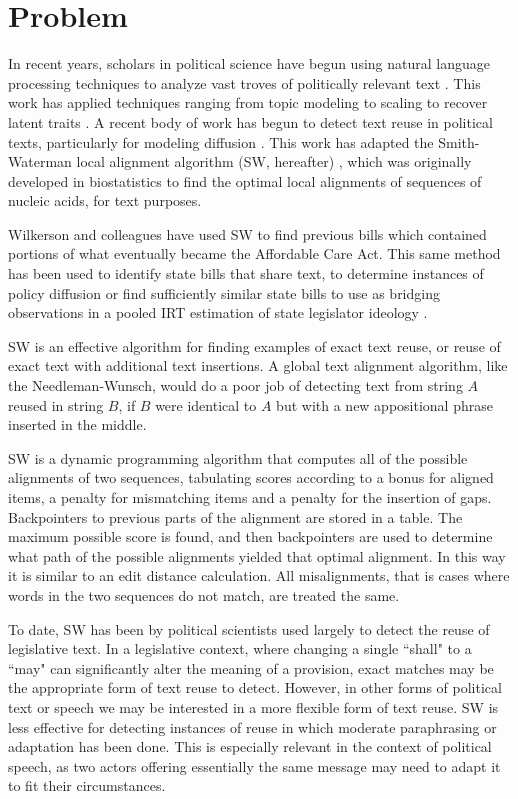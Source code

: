 \section{Problem}
In recent years, scholars in political science have begun using natural language processing techniques to analyze vast troves of politically relevant text \cite{grimmer2013text}. This work has applied techniques ranging from topic modeling \cite{roberts2014structural} to scaling to recover latent traits \cite{lowe2013validating}. A recent body of work has begun to detect text reuse in political texts, particularly for modeling diffusion \cite{smith2013infectious,smith2014detecting}. This work has adapted the Smith-Waterman local alignment algorithm (SW, hereafter) \cite{smith1981identification}, which was originally developed in biostatistics to find the optimal local alignments of sequences of nucleic acids, for text purposes.

Wilkerson and colleagues have used SW to find previous bills which contained portions of what eventually became the Affordable Care Act. This same method has been used to identify state bills that share text, to determine instances of policy diffusion \cite{Fridolin2017text} or find sufficiently similar state bills to use as bridging observations in a pooled IRT estimation of state legislator ideology \cite{Furnas2017ideal}.   

SW is an effective algorithm for finding examples of exact text reuse, or reuse of exact text with additional text insertions. A global text alignment algorithm, like the Needleman-Wunsch, would do a poor job of detecting text from string $A$ reused in string $B$, if $B$ were identical to $A$ but with a new appositional phrase inserted in the middle\cite{needleman1970general}. 

SW is a dynamic programming algorithm that computes all of the possible alignments of two sequences, tabulating scores according to a bonus for aligned items, a penalty for mismatching items and a penalty for the insertion of gaps. Backpointers to previous parts of the alignment are stored in a table. The maximum possible score is found, and then backpointers are used to determine what path of the possible alignments yielded that optimal alignment. In this way it is similar to an edit distance calculation. All misalignments, that is cases where words in the two sequences do not match, are treated the same.

To date, SW has been by political scientists used largely to detect the reuse of legislative text. In a legislative context, where changing a single ``shall" to a ``may" can significantly alter the meaning of a provision, exact matches may be the appropriate form of text reuse to detect. However, in other forms of political text or speech we may be interested in a more flexible form of text reuse. SW is less effective for detecting instances of reuse in which moderate paraphrasing or adaptation has been done. This is especially relevant in the context of political speech, as two actors offering essentially the same message may need to adapt it to fit their circumstances. 

